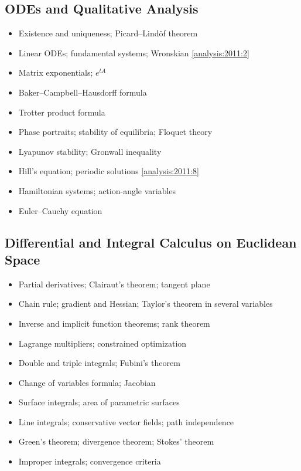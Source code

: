 \subsection{ODEs and Qualitative Analysis}

\begin{itemize}
  \item Existence and uniqueness; Picard--Lind\"of theorem
  \item Linear ODEs; fundamental systems; Wronskian \hfill \cref{analysis:2011:2}
  \item Matrix exponentials; $e^{tA}$
  \item Baker--Campbell--Hausdorff formula
  \item Trotter product formula
  \item Phase portraits; stability of equilibria; Floquet theory
  \item Lyapunov stability; Gronwall inequality
  \item Hill's equation; periodic solutions \hfill \cref{analysis:2011:8}
  \item Hamiltonian systems; action-angle variables
  \item Euler--Cauchy equation
\end{itemize}

\subsection{Differential and Integral Calculus on Euclidean Space}

\begin{itemize}
  \item Partial derivatives; Clairaut's theorem; tangent plane
  \item Chain rule; gradient and Hessian; Taylor's theorem in several variables
  \item Inverse and implicit function theorems; rank theorem
  \item Lagrange multipliers; constrained optimization
  \item Double and triple integrals; Fubini's theorem
  \item Change of variables formula; Jacobian
  \item Surface integrals; area of parametric surfaces
  \item Line integrals; conservative vector fields; path independence
  \item Green's theorem; divergence theorem; Stokes' theorem
  \item Improper integrals; convergence criteria
\end{itemize}

